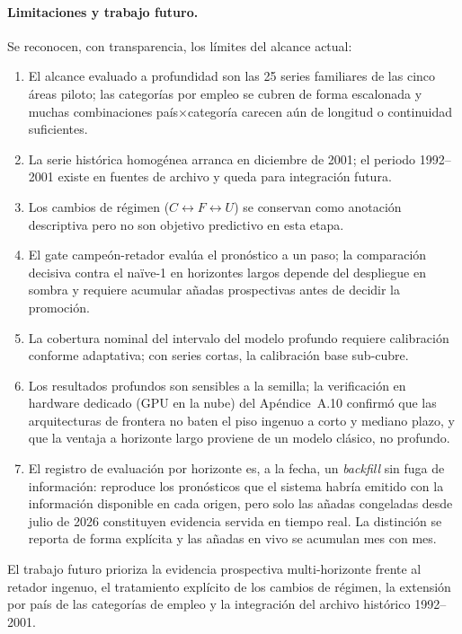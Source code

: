 \documentclass[12pt,letterpaper]{report}
\begin{document}
\paragraph{Limitaciones y trabajo futuro.} Se reconocen, con transparencia, los límites del
alcance actual:
\begin{enumerate}[label=(\roman*), leftmargin=*, itemsep=1pt]
\item El alcance evaluado a profundidad son las 25 series familiares de las cinco áreas
piloto; las categorías por empleo se cubren de forma escalonada y muchas combinaciones
país$\times$categoría carecen aún de longitud o continuidad suficientes.
\item La serie histórica homogénea arranca en diciembre de 2001; el periodo 1992--2001
existe en fuentes de archivo y queda para integración futura.
\item Los cambios de régimen ($C \leftrightarrow F \leftrightarrow U$) se conservan como
anotación descriptiva pero no son objetivo predictivo en esta etapa.
\item El gate campeón-retador evalúa el pronóstico a un paso; la comparación decisiva
contra el naïve-1 en horizontes largos depende del despliegue en sombra y requiere
acumular añadas prospectivas antes de decidir la promoción.
\item La cobertura nominal del intervalo del modelo profundo requiere calibración conforme
adaptativa; con series cortas, la calibración base sub-cubre.
\item Los resultados profundos son sensibles a la semilla; la verificación en hardware
dedicado (GPU en la nube) del Apéndice~A.10 confirmó que las arquitecturas de frontera no
baten el piso ingenuo a corto y mediano plazo, y que la ventaja a horizonte largo proviene de
un modelo clásico, no profundo.
\item El registro de evaluación por horizonte es, a la fecha, un \textit{backfill} sin fuga
de información: reproduce los pronósticos que el sistema habría emitido con la información
disponible en cada origen, pero solo las añadas congeladas desde julio de 2026 constituyen
evidencia servida en tiempo real. La distinción se reporta de forma explícita y las añadas
en vivo se acumulan mes con mes.
\end{enumerate}
El trabajo futuro prioriza la evidencia prospectiva multi-horizonte frente al retador
ingenuo, el tratamiento explícito de los cambios de régimen, la extensión por país de las
categorías de empleo y la integración del archivo histórico 1992--2001.
\end{document}
